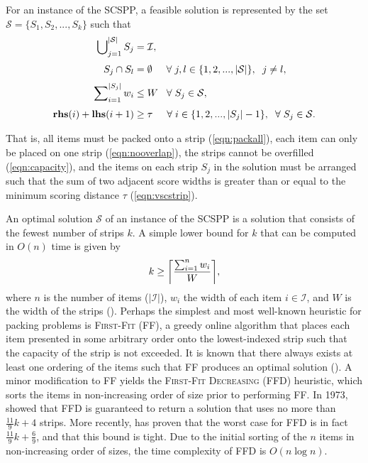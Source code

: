 \documentclass[oribibl]{llncs}
\begin{document}
For an instance of the SCSPP, a feasible solution is represented by the set $\mathcal{S} = \{S_1, S_2, ..., S_k\}$ such that
\begin{subequations}
	\begin{align}
		\bigcup\nolimits_{j=1}^{|\mathcal{S}|} S_j &= \mathcal{I}, \label{eqn:packall}\\[3pt]
		S_j \cap S_l &= \emptyset \hspace{5mm} \forall \hspace{1mm} j, l \in \{1, 2, ..., |\mathcal{S}|\}, \hspace{2mm} j \neq l, \label{eqn:nooverlap} \\[3pt]
		\sum\nolimits_{i=1}^{|S_j|}w_i & \leq W \hspace{3mm} \forall \hspace{1mm} S_j \in \mathcal{S}, \label{eqn:capacity} \\[3pt]
		\textup{\textbf{rhs}}(i) + \textup{\textbf{lhs}}(i+1) &\geq \tau \hspace {5mm} \forall \hspace{1mm} i \in \{1, 2, ..., |S_j|-1\}, \hspace{2mm} \forall \hspace{1mm} S_j \in \mathcal{S}. \label{eqn:vscstrip}
\end{align}
\end{subequations}

That is, all items must be packed onto a strip (\ref{eqn:packall}), each item can only be placed on one strip (\ref{eqn:nooverlap}), the strips cannot be overfilled (\ref{eqn:capacity}), and the items on each strip $S_j$ in the solution must be arranged such that the sum of two adjacent score widths is greater than or equal to the minimum scoring distance $\tau$ (\ref{eqn:vscstrip}).

An optimal solution $\mathcal{S}$ of an instance of the SCSPP is a solution that consists of the fewest number of strips $k$. A simple lower bound for $k$ that can be computed in $O(n)$ time is given by 
\begin{equation}
\label{eqn:lowerbound}
k \geq \ceil*{\frac{\sum_{i=1}^{n}w_i}{W}},
\end{equation}
where $n$ is the number of items ($|\mathcal{I}|$), $w_i$ the width of each item $i \in \mathcal{I}$, and $W$ is the width of the strips (\citealp{martello1990b}). Perhaps the simplest and most well-known heuristic for packing problems is \textsc{First-Fit} (FF), a greedy online algorithm that places each item presented in some arbitrary order onto the lowest-indexed strip such that the capacity of the strip is not exceeded. It is known that there always exists at least one ordering of the items such that FF produces an optimal solution (\citealp{lewis2009}). A minor modification to FF yields the \textsc{First-Fit Decreasing} (FFD) heuristic, which sorts the items in non-increasing order of size prior to performing FF. In 1973, \citeauthor{johnson1973} showed that FFD is guaranteed to return a solution that uses no more than $\frac{11}{9}k + 4$ strips. More recently, \cite{dosa2007} has proven that the worst case for FFD is in fact $\frac{11}{9}k + \frac{6}{9}$, and that this bound is tight. Due to the initial sorting of the $n$ items in non-increasing order of sizes, the time complexity of FFD is $O(n\log n)$.
\end{document}
